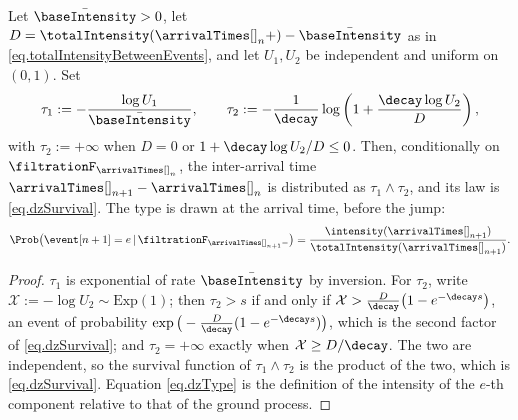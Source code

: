 \begin{thm}\label{thm.dassiosZhao}
 Let $\bar{\baseIntensity} > 0$, let
 $D = \totalIntensity(\arrivalTimes[]_n +) - \bar{\baseIntensity}$
 as in \eqref{eq.totalIntensityBetweenEvents},
 and let $U_1, U_2$ be independent and uniform on $(0,1)$.
 Set
 \begin{equation}\label{eq.dzDraws}
  \tau_1 := -\frac{\log U_1}{\bar{\baseIntensity}},
  \qquad
  \tau_2 := -\frac{1}{\decay}
  \log\left( 1 + \frac{\decay \log U_2}{D} \right),
 \end{equation}
 with $\tau_2 := +\infty$ when $D = 0$ or $1 + \decay \log U_2 / D \leq 0$.
 Then, conditionally on $\filtrationF_{\arrivalTimes[]_{n}}$,
 the inter-arrival time $\arrivalTimes[]_{n+1} - \arrivalTimes[]_{n}$ is distributed as
 $\tau_1 \wedge \tau_2$, and its law is \eqref{eq.dzSurvival}.
 The type is drawn at the arrival time, before the jump:
 \begin{equation}\label{eq.dzType}
  \Prob \big( \event[n+1] = e \, \vert \, \filtrationF_{\arrivalTimes[]_{n+1}-} \big)
  = \frac{\intensity(\arrivalTimes[]_{n+1})}{\totalIntensity(\arrivalTimes[]_{n+1})} .
 \end{equation}
\end{thm}
\begin{proof}
 $\tau_1$ is exponential of rate $\bar{\baseIntensity}$ by inversion.
 For $\tau_2$, write $\mathcal{X} := -\log U_2 \sim \mathrm{Exp}(1)$;
 then $\tau_2 > s$ if and only if
 $\mathcal{X} > \frac{D}{\decay}\big(1 - e^{-\decay s}\big)$,
 an event of probability
 $\exp\big(-\frac{D}{\decay}(1-e^{-\decay s})\big)$,
 which is the second factor of \eqref{eq.dzSurvival};
 and $\tau_2 = +\infty$ exactly when $\mathcal{X} \geq D/\decay$.
 The two are independent, so the survival function of $\tau_1 \wedge \tau_2$ is the
 product of the two, which is \eqref{eq.dzSurvival}.
 Equation \eqref{eq.dzType} is the definition of the intensity of the $e$-th component
 relative to that of the ground process.
\end{proof}

